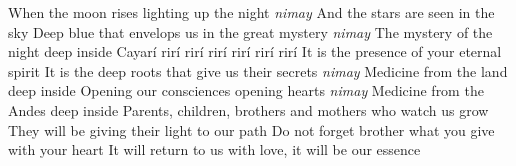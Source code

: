   \begin{translation}
    When the moon rises lighting up the night \emph{nimay}
    And the stars are seen in the sky
    Deep blue that envelops us in the great mystery \emph{nimay}
    The mystery of the night deep inside
    \nextverse
    Cayarí rirí rirí rirí rirí rirí rirí
    It is the presence of your eternal spirit
    \nextverse
    It is the deep roots that give us their secrets \emph{nimay}
    Medicine from the land deep inside
    Opening our consciences opening hearts \emph{nimay}
    Medicine from the Andes deep inside
    \nextverse
    Parents, children, brothers and mothers who watch us grow
    They will be giving their light to our path
    Do not forget brother what you give with your heart
    It will return to us with love, it will be our essence
  \end{translation}
\]\]\]\]\]\]\]\]\]\]\]\]\]\]\]\]\]\]\]\]\]\]\]\]\]\]\]\]\]\]\]\]\]\]\]\]\]\]\]\]\]\]\]\]\]\]\]\]\]\]\]\]\]\]\]\]\]\]\]\]\]\]\]\]\]\]\]\]\]\]\]\]\]\]\]\]\]\]\]\]\]\]\]\]\]\]\]\]\]\]\]\]\]\]\]\]\]\]\]\]\]\]\]\]\]\]\]\]\]\]\]\]\]\]\]\]\]\]\]\]\]\]\]\]\]\]\]\]\]\]\]\]\]\]\]\]\]\]\]\]\]\]\]\]\]\]\]\]\]\]\]\]\]\]\]\]\]\]\]\]\]\]\]\]\]\]\]\]\]\]\]\]\]\]\]\]\]\]\]\]\]\]\]\]\]\]\]\]\]\]\]\]\]\]\]\]\]\]\]\]\]\]\]\]\]\]\]\]\]\]\]\]\]\]\]\]\]\]\]\]\]\]\]\]\]\]\]\]\]\]\]\]\]\]\]\]\]\]\]\]\]\]\]\]\]\]\]\]\]\]\]\]\]\]\]\]\]\]\]\]\]\]\]\]\]\]\]\]\]\]\]\]\]\]\]\]\]\]\]\]\]\]\]\]\]\]\]\]\]\]\]\]\]\]\]\]\]\]\]\]\]\]\]\]\]\]\]\]\]\]\]\]\]\]\]\]\]\]\]\]\]\]\]\]\]\]\]\]\]\]\]\]\]\]\]\]\]\]\]\]\]\]\]\]\]\]\]\]\]\]\]\]\]\]\]\]\]\]\]\]\]\]\]\]\]\]\]\]\]\]\]\]\]\]\]\]\]\]\]\]\]\]\]\]\]\]\]\]\]\]\]\]\]\]\]\]\]\]\]\]\]\]\]\]\]\]\]\]\]\]\]\]\]\]\]\]\]\]\]\]\]\]\]\]\]\]\]\]\]\]\]\]\]\]\]\]\]\]\]\]\]\]\]\]\]\]\]\]\]\]\]\]\]\]\]\]\]\]\]\]\]\]\]\]\]\]\]\]\]\]\]\]\]\]\]\]\]\]\]\]\]\]\]\]\]\]\]\]\]\]\]\]\]\]\]\]\]\]\]\]\]\]\]\]\]\]\]\]\]\]\]\]\]\]\]\]\]\]\]\]\]\]\]\]\]\]\]\]\]\]\]\]\]\]\]\]\]\]\]\]\]\]\]\]\]\]\]\]\]\]\]\]\]\]\]\]\]\]\]\]\]\]\]\]\]\]\]\]\]\]\]\]\]\]\]\]\]\]\]\]\]\]\]\]\]\]\]\]\]\]\]\]\]\]\]\]\]\]\]\]\]\]\]\]\]\]\]\]\]\]\]\]\]\]\]\]\]\]\]\]\]\]\]\]\]\]\]\]\]\]\]\]\]\]\]\]\]\]\]\]\]\]\]\]\]\]\]\]\]\]\]\]\]\]\]\]\]\]\]\]\]\]\]\]\]\]\]\]\]\]\]\]\]\]\]\]\]\]\]\]\]\]\]\]\]\]\]\]\]\]\]\]\]\]\]\]\]\]\]\]\]\]\]\]\]\]\]\]\]\]\]\]\]\]\]\]\]\]\]\]\]\]\]\]\]\]\]\]\]\]\]\]\]\]\]\]\]\]\]\]\]\]\]\]\]\]\]\]\]\]\]\]\]\]\]\]\]\]\]\]\]\]\]\]\]\]\]\]\]\]\]\]\]\]\]\]\]\]\]\]\]\]\]\]\]\]\]\]\]\]\]\]\]\]\]\]\]\]\]\]\]\]\]\]\]\]\]\]\]\]\]\]\]\]\]\]\]\]\]\]\]\]\]\]\]\]\]\]\]\]\]\]\]\]\]\]\]\]\]\]\]\]\]\]\]\]\]\]\]\]\]\]\]\]\]\]\]\]\]\]\]\]\]\]\]\]\]\]\]\]\]\]\]\]\]\]\]\]\]\]\]\]\]\]\]\]\]\]\]\]\]\]\]\]\]\]\]\]\]\]\]\]\]\]\]\]\]\]\]\]\]\]\]\]\]\]\]\]\]\]\]\]\]\]\]\]\]\]\]\]\]\]\]\]\]\]\]\]\]\]\]\]\]\]\]\]\]\]\]\]\]\]\]\]\]\]\]\]\]\]\]\]\]\]\]\]\]\]\]\]\]\]\]\]\]\]\]\]\]\]\]\]\]\]\]\]\]\]\]\]\]\]\]\]\]\]\]\]\]\]\]\]\]\]\]\]\]\]\]\]\]\]\]\]\]\]\]\]\]\]\]\]\]\]\]\]\]\]\]\]\]\]\]\]\]\]\]\]\]\]\]\]\]\]\]\]\]\]\]\]\]\]\]\]\]\]\]\]\]\]\]\]\]\]\]\]\]\]\]\]\]\]\]\]\]\]\]\]\]\]\]\]\]\]\]\]\]\]\]\]\]\]\]\]\]\]\]\]\]\]\]\]\]\]\]\]\]\]\]\]\]\]\]\]\]\]\]\]\]\]\]\]\]\]\]\]\]\]\]\]\]\]\]\]\]\]\]\]\]\]\]\]\]\]\]\]\]\]\]\]\]\]\]\]\]\]\]\]\]\]\]\]\]\]\]\]\]\]\]\]\]\]\]\]\]\]\]\]\]\]\]\]\]\]\]\]\]\]\]\]\]\]\]\]\]\]\]\]\]\]\]\]\]\]\]\]\]\]\]\]\]\]\]\]\]\]\]\]\]\]\]\]\]\]\]\]\]\]\]\]\]\]\]\]\]\]\]\]\]
